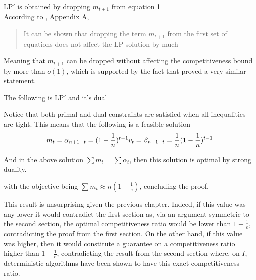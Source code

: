 $\mathrm{LP}'$ is obtained by dropping $m_{t+1}$ from equation 1\\
According to \cite{obmRaGreedy}, Appendix A,
\begin{quote}
	It can be shown that dropping the term $m_{t+1}$ from the first set of equations does not affect the LP solution by much
\end{quote}
Meaning that $m_{t+1}$ can be dropped without affecting the competitiveness bound by more than $o(1)$, which is supported by the fact that \cite{karp} proved a very similar statement. 

The following is $\mathrm{LP}'$ and it's dual

\noindent{}

Notice that both primal and dual constraints are satisfied when all inequalities are tight. This means that the following is a feasible solution\\

\[m_t=\alpha_{n+1-t}=(1-\frac{1}{n})^{t-1}\\v_t=\beta_{n+1-t}=\frac{1}{n}(1-\frac{1}{n})^{t-1}\]

And in the above solution $\sum m_t=\sum \alpha_t$, then this solution is optimal by strong duality.

with the objective being $\sum m_t\approx n(1-\frac{1}{e})$, concluding the proof.

This result is unsurprising given the previous chapter. Indeed, if this value was any lower it would contradict the first section as, via an argument symmetric to the second section, the optimal competitiveness ratio would be lower than $1-\frac{1}{e}$, contradicting the proof from the first section. On the other hand, if this value was higher, then it would constitute a guarantee on a competitiveness ratio higher than $1-\frac{1}{e}$, contradicting the result from the second section where, on $I$, deterministic algorithms have been shown to have this exact competitiveness ratio.